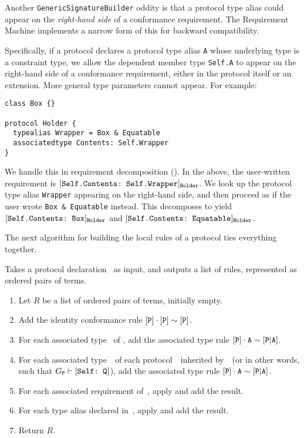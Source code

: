 \documentclass[../generics]{subfiles}
\begin{document}
\begin{example}
Another \texttt{GenericSignatureBuilder} oddity is that a protocol type alias could appear on the \emph{right-hand side} of a conformance requirement. The Requirement Machine implements a narrow form of this for backward compatibility.

Specifically, if a protocol declares a protocol type alias \texttt{A} whose underlying type is a constraint type, we allow the dependent member type \texttt{Self.A} to appear on the right-hand side of a conformance requirement, either in the protocol itself or an extension. More general type parameters cannot appear. For example:
\begin{Verbatim}
class Box {}

protocol Holder {
  typealias Wrapper = Box & Equatable
  associatedtype Contents: Self.Wrapper
}
\end{Verbatim}
We handle this in requirement decomposition (). In the above, the user-written requirement is $[\texttt{Self.Contents:~Self.Wrapper}]_{\texttt{Holder}}$. We look up the protocol type alias \texttt{Wrapper} appearing on the right-hand side, and then proceed as if the user wrote \verb|Box & Equatable| instead. This decomposes to yield $[\texttt{Self.Contents:~Box}]_{\texttt{Holder}}$ and $[\texttt{Self.Contents:~Equatable}]_{\texttt{Holder}}$.
\end{example}

The next algorithm for building the local rules of a protocol ties everything together.

\begin{algorithm}\label{rules for protocol algo}
Takes a protocol declaration \tP\ as input, and outputs a list of rules, represented as ordered pairs of terms.
\begin{enumerate}
\item Let $R$ be a list of ordered pairs of terms, initially empty.
\item Add the identity conformance rule $[\texttt{P}] \cdot [\texttt{P}] \sim [\texttt{P}]$.
\item For each associated type \nA\ of \tP, add the associated type rule $[\texttt{P}] \cdot \texttt{A} \sim [\texttt{P}|\texttt{A}]$.
\item For each associated type~\nA\ of each protocol~\tQ\ inherited by~\tP\ (or in other words, such that $G_{\texttt{P}}\vdash[\texttt{Self:~Q}]$), add the associated type rule $[\texttt{P}] \cdot \texttt{A} \sim [\texttt{P}|\texttt{A}]$.
\item For each associated requirement of~\tP, apply  and add the result.
\item For each type alias declared in~\tP, apply  and add the result.
\item Return $R$.
\end{enumerate}
\end{algorithm}
\end{document}
